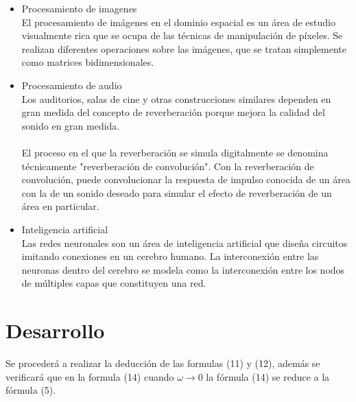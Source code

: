 \documentclass[10pt]{article}
\begin{document}
\begin{itemize}
    \item Procesamiento de imagenes\\
    El procesamiento de imágenes en el dominio espacial es un área de estudio visualmente rica que se ocupa de las técnicas de manipulación de píxeles. Se realizan diferentes operaciones sobre las imágenes, que se tratan simplemente como matrices bidimensionales.
    \item Procesamiento de audio\\
    Los auditorios, salas de cine y otras construcciones similares dependen en gran medida del concepto de reverberación  porque mejora la calidad del sonido en gran medida.\\\\
    El proceso en el que la reverberación se simula digitalmente se denomina técnicamente "reverberación de convolución". Con la reverberación de convolución, puede convolucionar la respuesta de impulso conocida de un área con la de un sonido deseado para simular el efecto de reverberación de un área en particular. 
    \item Inteligencia artificial\\
    Las redes neuronales son un área de inteligencia artificial que diseña circuitos imitando conexiones en un cerebro humano. La interconexión entre las neuronas dentro del cerebro se modela como la interconexión entre los nodos de múltiples capas que constituyen una red\cite{IEEEreferencias:Ref1}.
\end{itemize}


\newpage
\section{Desarrollo}
Se procederá a realizar la deducción de las formulas (11) y (12), además se verificará que en la formula (14) cuando ${ \omega \to 0}$ la fórmula (14) se reduce a la fórmula (5). 
\end{document}
